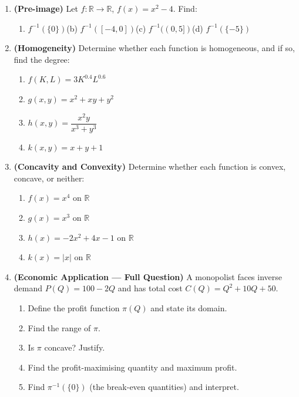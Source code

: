 \documentclass[12pt, a4paper]{article}
\theoremstyle{definition}
\newcommand{\R}{\mathbb{R}}
\begin{document}
\begin{enumerate}[label=\textbf{B\arabic*.}, leftmargin=2.5em]
  \item \textbf{(Pre-image)} Let $f:\R\to\R$, $f(x) = x^2 - 4$. Find:
  \begin{enumerate}[label=(\alph*)]
    \item $f^{-1}(\{0\})$\quad (b) $f^{-1}([-4, 0])$\quad (c) $f^{-1}((0,5])$\quad (d) $f^{-1}(\{-5\})$
  \end{enumerate}
\newpage
  \item \textbf{(Homogeneity)} Determine whether each function is homogeneous, and if so, find the degree:
  \begin{enumerate}[label=(\alph*)]
    \item $f(K,L) = 3K^{0.4}L^{0.6}$
    \item $g(x,y) = x^2 + xy + y^2$
    \item $h(x,y) = \dfrac{x^2 y}{x^3 + y^3}$
    \item $k(x,y) = x + y + 1$
  \end{enumerate}

  \item \textbf{(Concavity and Convexity)} Determine whether each function is convex, concave, or neither:
  \begin{enumerate}[label=(\alph*)]
    \item $f(x) = x^4$ on $\R$
    \item $g(x) = x^3$ on $\R$
    \item $h(x) = -2x^2 + 4x - 1$ on $\R$
    \item $k(x) = |x|$ on $\R$
  \end{enumerate}

  \item \textbf{(Economic Application --- Full Question)} A monopolist faces inverse demand $P(Q) = 100 - 2Q$ and has total cost $C(Q) = Q^2 + 10Q + 50$.
  \begin{enumerate}[label=(\alph*)]
    \item Define the profit function $\pi(Q)$ and state its domain.
    \item Find the range of $\pi$.
    \item Is $\pi$ concave? Justify.
    \item Find the profit-maximising quantity and maximum profit.
    \item Find $\pi^{-1}(\{0\})$ (the break-even quantities) and interpret.
  \end{enumerate}
\end{enumerate}

\newpage
\end{document}
